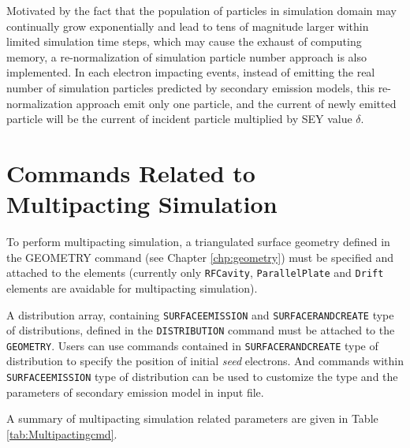 Motivated by the fact that the population of particles in simulation domain may continually grow exponentially and lead to tens of magnitude larger within limited simulation time steps, which may cause the exhaust of computing memory, a re-normalization of simulation particle number approach is also implemented. In each electron impacting events, instead of emitting the real number of simulation particles predicted by secondary emission models, this re-normalization approach emit only one particle, and the current of newly emitted particle will be the current of incident particle multiplied by SEY value $\delta$.    
\clearpage
\section{Commands Related to Multipacting Simulation}
\label{sec:MultipactingCmd}
To perform multipacting simulation, a triangulated surface geometry defined in the  GEOMETRY command (see  Chapter \ref{chp:geometry})  must be specified and attached to the elements (currently only {\tt RFCavity}, {\tt ParallelPlate} and {\tt Drift} elements are avaidable for multipacting simulation). 

A distribution array, containing {\tt SURFACEEMISSION} and {\tt SURFACERANDCREATE} type of distributions, defined in the {\tt DISTRIBUTION} command must be attached to the  
{\tt GEOMETRY}. Users can use commands contained in {\tt SURFACERANDCREATE} type of distribution to specify the position of initial {\em seed} electrons. And commands within {\tt SURFACEEMISSION} type of distribution can be used to customize the type and the parameters of secondary emission model in input file.

A summary of multipacting simulation related parameters are given in Table \ref{tab:Multipactingcmd}.

